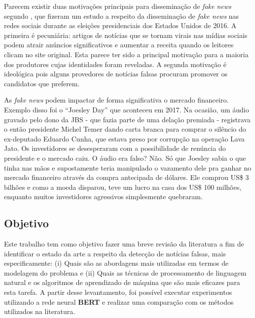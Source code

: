 Parecem existir duas motivações principais para disseminação de \textit{fake news} segundo \citet{allcot2017}, que fizeram um estudo a respeito da disseminação de \textit{fake news} nas redes sociais durante as eleições presidenciais dos Estados Unidos de 2016. 
A primeira é pecuniária: artigos de notícias que se tornam virais nas mídias sociais podem atrair anúncios significativos e aumentar a receita quando os leitores clicam no site original. 
Esta parece ter sido a principal motivação para a maioria dos produtores cujas identidades foram reveladas. 
A segunda motivação é ideológica pois alguns provedores de notícias falsas procuram promover os candidatos que preferem. 

As \textit{fake news} podem impactar de forma significativa o mercado financeiro.
Exemplo disso foi o ``Joesley Day'' \cite{shs2020} que aconteceu em 2017. 
Na ocasião, um áudio gravado pelo dono da JBS - que fazia parte de uma delação premiada - registrava o então presidente Michel Temer dando carta branca para comprar o silêncio do ex-deputado Eduardo Cunha, que estava preso por corrupção na operação Lava Jato.
Os investidores se desesperaram com a possibilidade de renúncia do presidente e o mercado caiu. 
O áudio era falso? Não. 
Só que Joesley sabia o que tinha nas mãos e supostamente teria manipulado o vazamento dele pra ganhar no mercado financeiro através da compra antecipada de dólares. 
Ele comprou US\$ 3 bilhões e como a moeda disparou, teve um lucro na casa dos US\$ 100 milhões, enquanto muitos investidores agressivos simplesmente quebraram.

\subsection{Objetivo}


Este trabalho tem como objetivo fazer uma breve revisão da literatura a fim de identificar o estado da arte a respeito da detecção de notícias falsas, mais especificamente: (i) Quais são as abordagens mais utilizadas em termos de modelagem do problema e (ii) Quais as técnicas de processamento de linguagem natural e os algoritmos de aprendizado de máquina que são mais eficazes para esta tarefa. A partir desse levantamento, foi possível executar experimentos utilizando a rede neural \textbf{BERT} e realizar uma comparação com os métodos utilizados na literatura.



